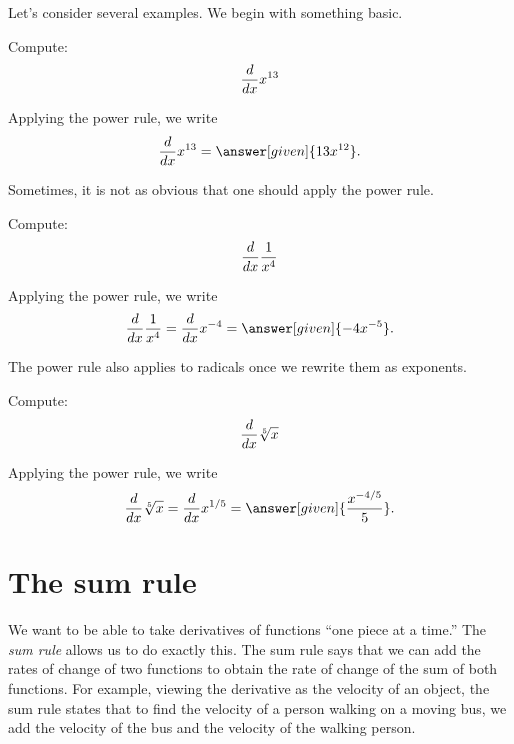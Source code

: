 \documentclass{ximera}
\begin{document}
Let's consider several examples. We begin with something basic.

\begin{example}
Compute:
\[
\frac{d}{\mathop{}\!d x} x^{13}
\]
\begin{explanation}
Applying the power rule, we write
\[
\ddx x^{13} = \answer[given]{13x^{12}}.
\]
\end{explanation}
\end{example}

Sometimes, it is not as obvious that one should apply the power rule.

\begin{example}
Compute:
\[
\frac{d}{\mathop{}\!d x} \frac{1}{x^4}
\]
\begin{explanation}
Applying the power rule, we write
\[
\ddx \frac{1}{x^4} = \ddx x^{-4} = \answer[given]{-4x^{-5}}.
\]
\end{explanation}
\end{example}

The power rule also applies to radicals once we rewrite them as exponents.

\begin{example}
Compute:
\[
\frac{d}{\mathop{}\!d x} \sqrt[5]{x}
\]
\begin{explanation}
Applying the power rule, we write
\[
\ddx \sqrt[5]{x} = \ddx x^{1/5} = \answer[given]{\frac{x^{-4/5}}{5}}.
\]
\end{explanation}
\end{example}






\section{The sum rule}

We want to be able to take derivatives of functions ``one piece at a
time.'' The \textit{sum rule} allows us to do exactly this. The sum rule says
that we can add the rates of change of two functions to obtain the
rate of change of the sum of both functions. For example, viewing the
derivative as the velocity of an object, the sum rule states that to find the
velocity of a person walking on a moving bus, we add the
velocity of the bus and the velocity of the walking person.
\end{document}
